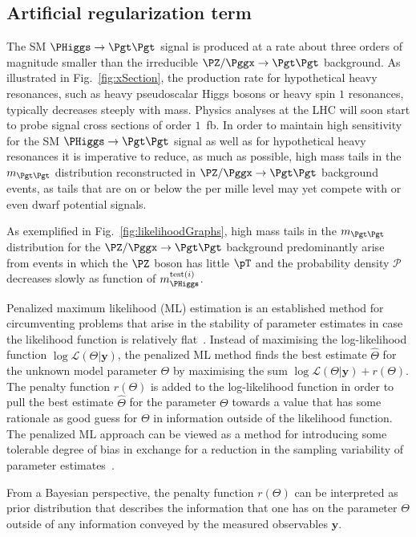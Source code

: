 \subsection{Artificial regularization term}
\label{sec:mem_logM}

The SM $\PHiggs \to \Pgt\Pgt$ signal is produced at a rate about three orders of magnitude smaller 
than the irreducible $\PZ/\Pggx \to \Pgt\Pgt$ background.
As illustrated in Fig.~\ref{fig:xSection},
the production rate for hypothetical heavy resonances, such as heavy pseudoscalar Higgs bosons or heavy spin $1$ resonances,
typically decreases steeply with mass.
Physics analyses at the LHC will soon start to probe signal cross sections of order $1$~fb.
In order to maintain high sensitivity for the SM $\PHiggs \to \Pgt\Pgt$ signal as well as for hypothetical heavy resonances
it is imperative to reduce, as much as possible, high mass tails in the $m_{\Pgt\Pgt}$ distribution reconstructed in $\PZ/\Pggx \to \Pgt\Pgt$ background events,
as tails that are on or below the per mille level may yet compete with or even dwarf potential signals.

As exemplified in Fig.~\ref{fig:likelihoodGraphs},
high mass tails in the $m_{\Pgt\Pgt}$ distribution for the $\PZ/\Pggx \to \Pgt\Pgt$ background predominantly arise from events in which the $\PZ$ boson has little $\pT$
and the probability density $\mathcal{P}$ 
decreases slowly as function of $m_{\PHiggs}^{\textrm{test}(i)}$.

Penalized maximum likelihood (ML) estimation is an established method for circumventing problems 
that arise in the stability of parameter estimates in case the likelihood function is relatively flat~\cite{penalizedMaximumLikelihood1}.
Instead of maximising the log-likelihood function $\log \mathcal{L}(\Theta|\bm{y})$,
the penalized ML method finds the best estimate $\hat{\Theta}$ for the unknown model parameter $\Theta$ by maximising the sum $\log \mathcal{L}(\Theta|\bm{y}) + r(\Theta)$.
The penalty function $r(\Theta)$ is added to the log-likelihood function in order to pull the best estimate $\hat{\Theta}$ for the parameter $\Theta$
towards a value that has some rationale as good guess for $\Theta$ in information outside of the likelihood function.
The penalized ML approach can be viewed as a method for introducing some tolerable degree of bias 
in exchange for a reduction in the sampling variability of parameter estimates~\cite{penalizedMaximumLikelihood2}.

From a Bayesian perspective, the penalty function $r(\Theta)$ can be interpreted as prior distribution that describes the information that one has on the parameter $\Theta$
outside of any information conveyed by the measured observables $\bm{y}$.

